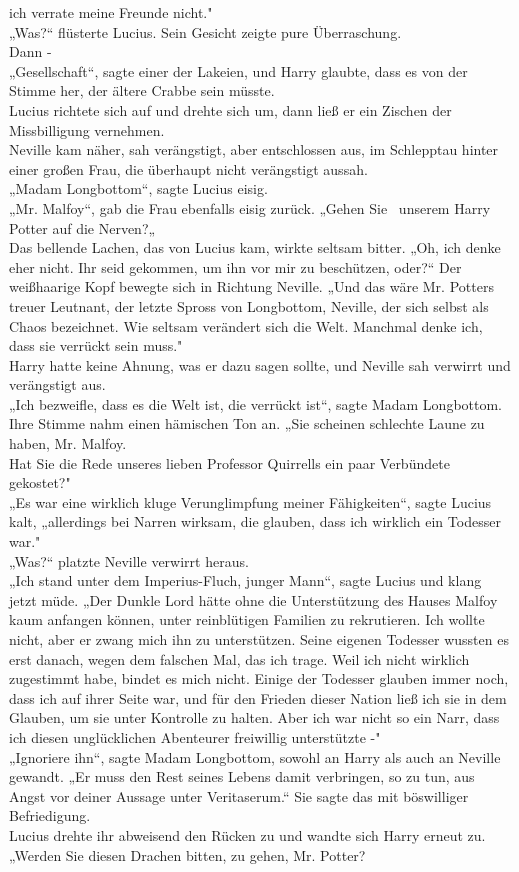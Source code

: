 {ich verrate meine Freunde nicht."\\ „Was?“ flüsterte Lucius. Sein Gesicht zeigte pure Überraschung.\\ Dann -\\ „Gesellschaft“, sagte einer der Lakeien, und Harry glaubte, dass es von der Stimme her, der ältere Crabbe sein müsste.\\ Lucius richtete sich auf und drehte sich um, dann ließ er ein Zischen der Missbilligung vernehmen.\\ Neville kam näher, sah verängstigt, aber entschlossen aus, im Schlepptau hinter einer großen Frau, die überhaupt nicht verängstigt aussah.\\ „Madam Longbottom“, sagte Lucius eisig.\\ „Mr. Malfoy“, gab die Frau ebenfalls eisig zurück. „Gehen Sie ~unserem Harry Potter auf die Nerven?„\\ Das bellende Lachen, das von Lucius kam, wirkte seltsam bitter. „Oh, ich denke eher nicht. Ihr seid gekommen, um ihn vor mir zu beschützen, oder?“ Der weißhaarige Kopf bewegte sich in Richtung Neville. „Und das wäre Mr. Potters treuer Leutnant, der letzte Spross von Longbottom, Neville, der sich selbst als Chaos bezeichnet. Wie seltsam verändert sich die Welt. Manchmal denke ich, dass sie verrückt sein muss."\\ Harry hatte keine Ahnung, was er dazu sagen sollte, und Neville sah verwirrt und verängstigt aus.\\ „Ich bezweifle, dass es die Welt ist, die verrückt ist“, sagte Madam Longbottom. Ihre Stimme nahm einen hämischen Ton an. „Sie scheinen schlechte Laune zu haben, Mr. Malfoy.\\ Hat Sie die Rede unseres lieben Professor Quirrells ein paar Verbündete gekostet?"\\ „Es war eine wirklich kluge Verunglimpfung meiner Fähigkeiten“, sagte Lucius kalt, „allerdings bei Narren wirksam, die glauben, dass ich wirklich ein Todesser war."\\ „Was?“ platzte Neville verwirrt heraus.\\ „Ich stand unter dem Imperius-Fluch, junger Mann“, sagte Lucius und klang jetzt müde. „Der Dunkle Lord hätte ohne die Unterstützung des Hauses Malfoy kaum anfangen können, unter reinblütigen Familien zu rekrutieren. Ich wollte nicht, aber er zwang mich ihn zu unterstützen. Seine eigenen Todesser wussten es erst danach, wegen dem falschen Mal, das ich trage. Weil ich nicht wirklich zugestimmt habe, bindet es mich nicht. Einige der Todesser glauben immer noch, dass ich auf ihrer Seite war, und für den Frieden dieser Nation ließ ich sie in dem Glauben, um sie unter Kontrolle zu halten. Aber ich war nicht so ein Narr, dass ich diesen unglücklichen Abenteurer freiwillig unterstützte -"\\ „Ignoriere ihn“, sagte Madam Longbottom, sowohl an Harry als auch an Neville gewandt. „Er muss den Rest seines Lebens damit verbringen, so zu tun, aus Angst vor deiner Aussage unter Veritaserum.“ Sie sagte das mit böswilliger Befriedigung.\\ Lucius drehte ihr abweisend den Rücken zu und wandte sich Harry erneut zu. „Werden Sie diesen Drachen bitten, zu gehen, Mr. Potter? }

